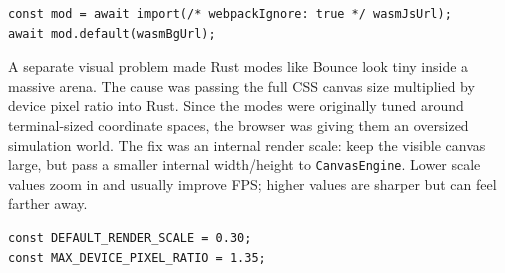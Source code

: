 \documentclass[11pt, letterpaper]{article}
\begin{document}
\begin{tcolorbox}[colback=logbg, colframe=logborder, breakable, arc=3pt, boxrule=1pt]
\begin{description}[noitemsep, leftmargin=2cm, style=nextline]
\begin{lstlisting}[style=shell]
const mod = await import(/* webpackIgnore: true */ wasmJsUrl);
await mod.default(wasmBgUrl);
  \end{lstlisting}
  \item[\textbf{Additional Fix: Render Scale}] A separate visual problem made Rust modes like Bounce look tiny inside a massive arena. The cause was passing the full CSS canvas size multiplied by device pixel ratio into Rust. Since the modes were originally tuned around terminal-sized coordinate spaces, the browser was giving them an oversized simulation world. The fix was an internal render scale: keep the visible canvas large, but pass a smaller internal width/height to \texttt{CanvasEngine}. Lower scale values zoom in and usually improve FPS; higher values are sharper but can feel farther away.
  \begin{lstlisting}[style=shell]
const DEFAULT_RENDER_SCALE = 0.30;
const MAX_DEVICE_PIXEL_RATIO = 1.35;


\end{lstlisting}
\end{description}
\end{tcolorbox}
\end{document}
